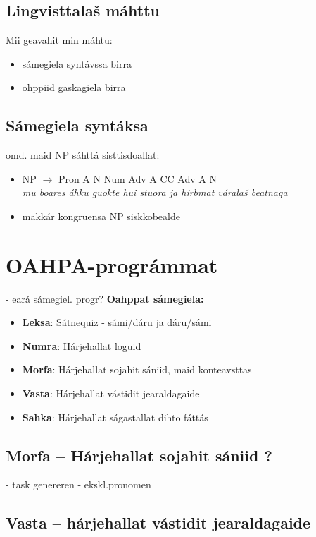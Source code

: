 \documentclass[a4paper,14pt]{article}
\begin{document}
\subsection{Lingvisttalaš máhttu} 
Mii geavahit min máhtu:
\begin{itemize}
\item sámegiela syntávssa birra		
\item ohppiid gaskagiela birra
\end{itemize}

\subsection{Sámegiela syntáksa} 
omd. maid NP sáhttá sisttisdoallat:
\begin{itemize}
\item \small{NP $\rightarrow$ Pron A N Num Adv A CC Adv A N}  \\ 	
\textit{mu boares áhku guokte hui stuora ja hirbmat váralaš beatnaga}	
\item makkár kongruensa NP siskkobealde
\end{itemize}


\section{OAHPA-prográmmat}
- eará sámegiel. progr?
\textbf{Oahppat sámegiela:}\\
\begin{itemize}
\item \textbf{Leksa}: Sátnequiz - sámi/dáru ja dáru/sámi
\item  \textbf{Numra}: Hárjehallat loguid
\item  \textbf{Morfa}: Hárjehallat sojahit sániid, maid konteavsttas
\item  \textbf{Vasta}: Hárjehallat vástidit jearaldagaide
\item  \textbf{Sahka}: Hárjehallat ságastallat dihto fáttás
\end{itemize}




\subsection{Morfa -- Hárjehallat sojahit sániid ?}
- task genereren
- ekskl.pronomen


\subsection{Vasta -- hárjehallat vástidit jearaldagaide} 
\end{document}
